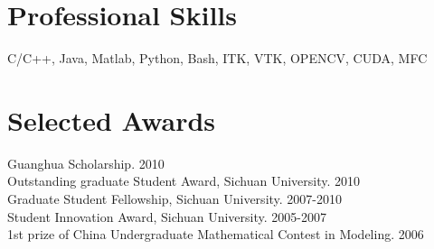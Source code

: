 \documentclass[line,margin]{res}
\begin{document}
\begin{resume}
%

\section{\sc Professional Skills}
\smallskip

C/C++, Java, Matlab, Python, Bash, ITK, VTK, OPENCV, CUDA, MFC
 
\section{\sc Selected Awards}


Guanghua Scholarship.  \hfill       2010\\
Outstanding graduate Student Award, Sichuan University. \hfill       2010\\
Graduate Student Fellowship, Sichuan University.  \hfill       2007-2010\\
Student Innovation Award, Sichuan University.  \hfill        2005-2007 \\%
1st prize of China Undergraduate Mathematical Contest in Modeling.  \hfill       2006



\end{resume}

%
%
\end{document}
